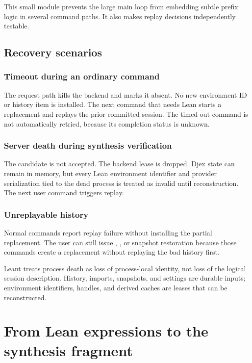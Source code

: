 \documentclass[10pt,letterpaper,oneside]{report}
\newcommand{\code}[1]{\texttt{\detokenize{#1}}}
\begin{document}
This small module prevents the large main loop from embedding subtle prefix logic in several command paths. It also makes replay decisions independently testable.

\section{Recovery scenarios}

\subsection{Timeout during an ordinary command}

The request path kills the backend and marks it absent. No new environment ID or history item is installed. The next command that needs Lean starts a replacement and replays the prior committed session. The timed-out command is not automatically retried, because its completion status is unknown.

\subsection{Server death during synthesis verification}

The candidate is not accepted. The backend lease is dropped. Djex state can remain in memory, but every Lean environment identifier and provider serialization tied to the dead process is treated as invalid until reconstruction. The next user command triggers replay.

\subsection{Unreplayable history}

Normal commands report replay failure without installing the partial replacement. The user can still issue \code{:reset}, \code{:load}, or snapshot restoration because those commands create a replacement without replaying the bad history first.

\begin{summarybox}
Leant treats process death as loss of process-local identity, not loss of the logical session description. History, imports, snapshots, and settings are durable inputs; environment identifiers, handles, and derived caches are leases that can be reconstructed.
\end{summarybox}

\chapter{From Lean expressions to the synthesis fragment}\label{ch:leant-fragment}
\end{document}
